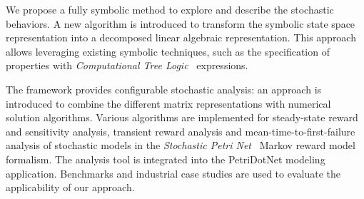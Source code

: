 We propose a fully symbolic method to explore and describe the
stochastic behaviors. A new algorithm is introduced to transform the
symbolic state space representation into a decomposed linear algebraic
representation. This approach allows leveraging existing symbolic
techniques, such as the specification of properties with
\emph{Computational Tree Logic}~ expressions.

The framework provides configurable stochastic analysis: an approach
is introduced to combine the different matrix representations with
numerical solution algorithms. Various algorithms are implemented for
steady-state reward and sensitivity analysis, transient reward
analysis and mean-time-to-first-failure analysis of stochastic models
in the \emph{Stochastic Petri Net}~ Markov reward
model formalism. The analysis tool is integrated into the PetriDotNet
modeling application.  Benchmarks and industrial case studies are used
to evaluate the applicability of our approach.
